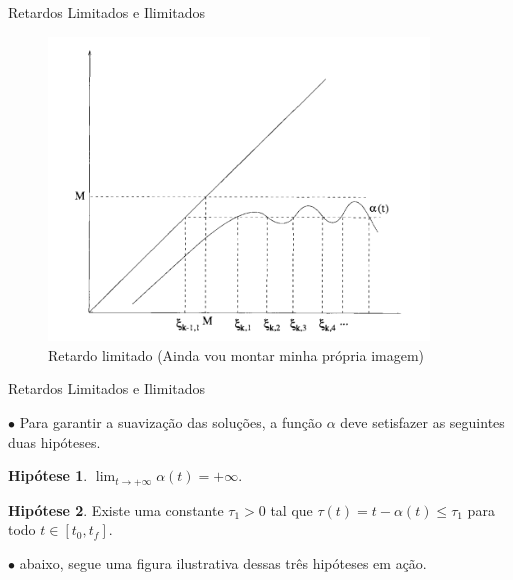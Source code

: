 \documentclass{beamer}
\theoremstyle{plain}
\theoremstyle{definition}
\newtheorem{hip}{Hipótese}
\begin{document}

\begin{frame}{Retardos Limitados e Ilimitados}

    \begin{figure}
        \begin{center}
            \includegraphics[width=0.9\textwidth, height=0.7\textheight]{retardo_limitado.png}
        \end{center}
        \caption{Retardo limitado (Ainda vou montar minha própria imagem)}\label{fig:Retardo_limitado}
    \end{figure}

\end{frame}



\begin{frame}{Retardos Limitados e Ilimitados}
    
    $\bullet$ Para garantir a suavização das soluções, a função $\alpha$ deve setisfazer as seguintes duas hipóteses.

    \begin{hip}
        \label{H2:hipotese:hypothesis}
        $\lim _{t \rightarrow+\infty} \alpha(t)=+\infty$.
    \end{hip}


    \begin{hip}
        \label{H3:hipotese:hypothesis}
        Existe uma constante \(\tau_{1}>0\) tal que \(\tau(t)=t-\alpha(t) \leq \tau_{1}\) para todo \(t \in\left[t_{0}, t_{f}\right]\).
    \end{hip}

    $\bullet$ abaixo, segue uma figura ilustrativa dessas três hipóteses em ação.

\end{frame}
\end{document}
